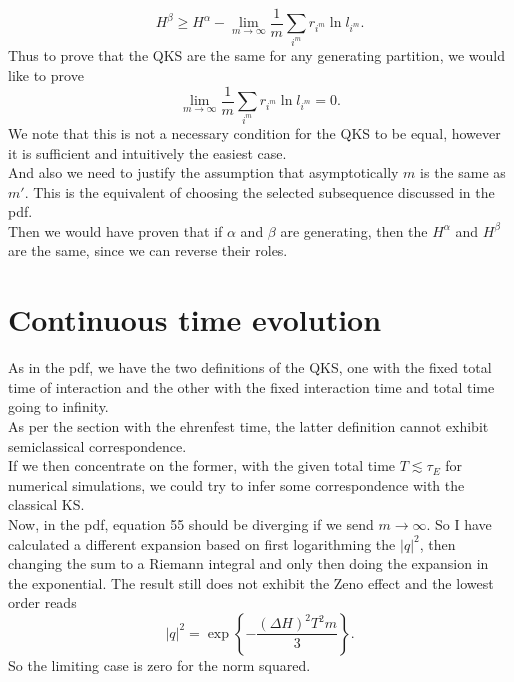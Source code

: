 \documentclass{article}
\begin{document}
\begin{equation}
H^\beta
\geq
H^\alpha
-
\lim_{m\to\infty}
\frac{1}{m}
\sum_{i^m}r_{i^m}\ln l_{i^m}.
\end{equation}
Thus to prove that the QKS are the same for any generating partition, we would like to prove
\begin{equation}
    \lim_{m\to\infty}
\frac{1}{m}
\sum_{i^m}r_{i^m}\ln l_{i^m} = 0.
\end{equation}
We note that this is not a necessary condition for the QKS to be equal, however it is sufficient and intuitively the easiest case.\\
And also we need to justify the assumption that asymptotically $m$ is the same as $m'$. This is the equivalent of choosing the selected subsequence discussed in the pdf.\\
Then we would have proven that if $\alpha$ and $\beta$ are generating, then the $H^\alpha$ and $H^\beta$ are the same, since we can reverse their roles. 
\section{Continuous time evolution}
As in the pdf, we have the two definitions of the QKS, one with the fixed total time of interaction and the other with the fixed interaction time and total time going to infinity. \\
As per the section with the ehrenfest time, the latter definition cannot exhibit semiclassical correspondence.\\
If we then concentrate on the former, with the given total time $T \lesssim\tau_E$ for numerical simulations, we could try to infer some correspondence with the classical KS.\\
Now, in the pdf, equation 55 should be diverging if we send $m \to \infty$. So I have calculated a different expansion based on first logarithming the $|q|^2$, then changing the sum to a Riemann integral and only then doing the expansion in the exponential. The result still does not exhibit the Zeno effect and the lowest order reads
\begin{equation}
    |q|^2 = \exp\left\{-\frac{(\Delta H)^2T^2m}{3}\right\}.
\end{equation}
So the limiting case is zero for the norm squared. 
\end{document}
